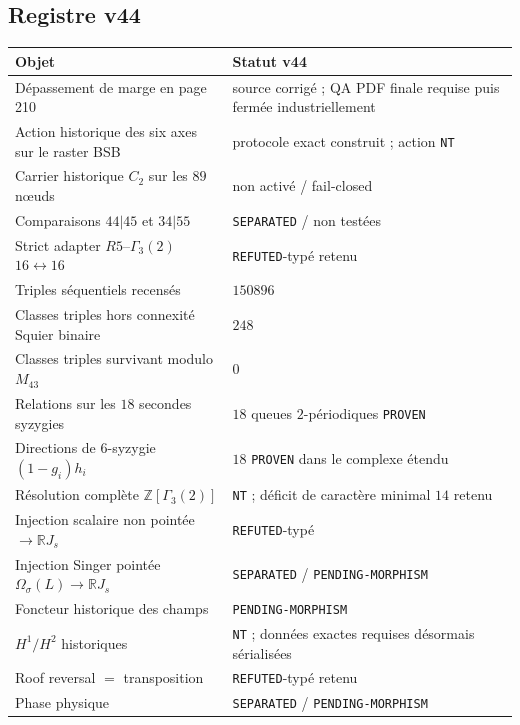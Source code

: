 \documentclass[11pt,a4paper]{article}
\newcommand{\certProven}{\texttt{PROVEN}}
\newcommand{\certRefuted}{\texttt{REFUTED}}
\newcommand{\certSeparated}{\texttt{SEPARATED}}
\newcommand{\certPending}{\texttt{PENDING-MORPHISM}}
\newcommand{\certNT}{\texttt{NT}}
\begin{document}
\subsection{Registre v44}

\begin{center}
\begin{tabularx}{\textwidth}{@{}Xl@{}}
\toprule
Objet & Statut v44\\
\midrule
Dépassement de marge en page 210 & source corrigé ; QA PDF finale requise puis fermée industriellement\\
Action historique des six axes sur le raster BSB & protocole exact construit ; action \certNT\\
Carrier historique $C_2$ sur les $89$ nœuds & non activé / fail-closed\\
Comparaisons $44|45$ et $34|55$ & \certSeparated{} / non testées\\
Strict adapter $R5$--$\Gamma_3(2)$ $16\leftrightarrow16$ & \certRefuted{}-typé retenu\\
Triples séquentiels recensés & $150896$\\
Classes triples hors connexité Squier binaire & $248$\\
Classes triples survivant modulo $M_{43}$ & $0$\\
Relations sur les $18$ secondes syzygies & $18$ queues $2$-périodiques \certProven\\
Directions de $6$-syzygie $(1-g_i)h_i$ & $18$ \certProven{} dans le complexe étendu\\
Résolution complète $\mathbb Z[\Gamma_3(2)]$ & \certNT{} ; déficit de caractère minimal $14$ retenu\\
Injection scalaire non pointée $\to\mathbb RJ_s$ & \certRefuted{}-typé\\
Injection Singer pointée $\Omega_\sigma(L)\to\mathbb RJ_s$ & \certSeparated{} / \certPending\\
Foncteur historique des champs & \certPending\\
$H^1/H^2$ historiques & \certNT{} ; données exactes requises désormais sérialisées\\
Roof reversal $=$ transposition & \certRefuted{}-typé retenu\\
Phase physique & \certSeparated{} / \certPending\\
\bottomrule
\end{tabularx}
\end{center}
\end{document}

